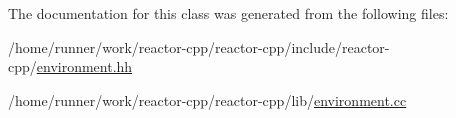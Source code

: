 The documentation for this class was generated from the following files\+:\begin{DoxyCompactItemize}
\item 
/home/runner/work/reactor-\/cpp/reactor-\/cpp/include/reactor-\/cpp/\hyperlink{environment_8hh}{environment.\+hh}\item 
/home/runner/work/reactor-\/cpp/reactor-\/cpp/lib/\hyperlink{environment_8cc}{environment.\+cc}\end{DoxyCompactItemize}

